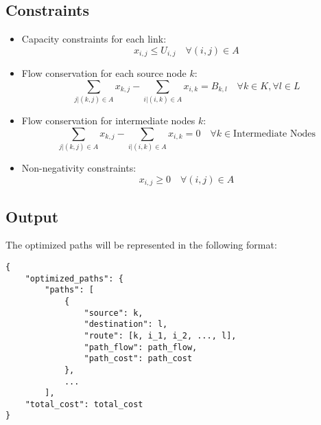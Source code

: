 \documentclass{article}
\begin{document}
\subsection*{Constraints}
\begin{itemize}
    \item Capacity constraints for each link:
    \[
    x_{i,j} \leq U_{i,j} \quad \forall (i,j) \in A
    \]
    
    \item Flow conservation for each source node \( k \):
    \[
    \sum_{j | (k,j) \in A} x_{k,j} - \sum_{i | (i,k) \in A} x_{i,k} = B_{k,l} \quad \forall k \in K, \forall l \in L
    \]

    \item Flow conservation for intermediate nodes \( k \):
    \[
    \sum_{j | (k,j) \in A} x_{k,j} - \sum_{i | (i,k) \in A} x_{i,k} = 0 \quad \forall k \in \text{Intermediate Nodes}
    \]

    \item Non-negativity constraints:
    \[
    x_{i,j} \geq 0 \quad \forall (i,j) \in A
    \]
\end{itemize}

\subsection*{Output}
The optimized paths will be represented in the following format:
\begin{verbatim}
{
    "optimized_paths": {
        "paths": [
            {
                "source": k,
                "destination": l,
                "route": [k, i_1, i_2, ..., l],
                "path_flow": path_flow,
                "path_cost": path_cost
            },
            ...
        ],
    "total_cost": total_cost
}
\end{verbatim}
\end{document}
